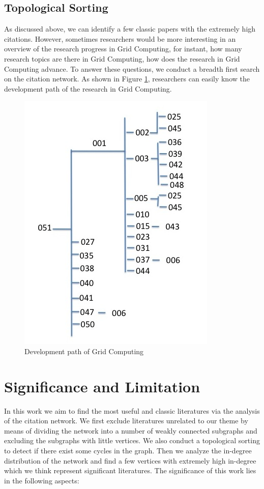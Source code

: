 \subsection{Topological Sorting}
As discussed above, we can identify a few classic papers with the extremely high citations. However, sometimes researchers would be more interesting in an overview of the research progress in Grid Computing, for instant, how many research topics are there in Grid Computing, how does the research in Grid Computing advance.  To answer these questions, we conduct a breadth first search on the citation network. As shown in Figure \ref{F:graph}, researchers can easily know the development path of the research in Grid Computing.

\begin{figure}[ht!]
\includegraphics [totalheight=0.5\textheight]{images/structure.jpg}
\caption {Development path of Grid Computing}
\label {F:graph}
\end{figure}

\section{Significance and Limitation \label{S:Significance} }
In this work we aim to find the most useful and classic literatures via the analysis of the citation network. We first exclude literatures unrelated to our theme by means of  dividing the network into a number of weakly connected subgraphs and excluding the subgraphs with little vertices. We also conduct a topological sorting to detect if there exist some cycles in the graph. Then we analyze the in-degree distribution of the network and find a few vertices with extremely high in-degree which we think represent significant literatures.  The significance of this work lies in the following aspects:


